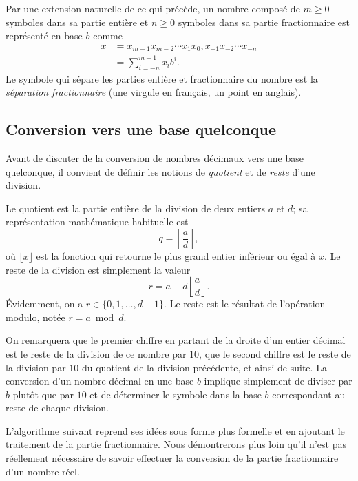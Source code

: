 \documentclass[letterpaper,11pt,english,french]{memoir}
\theoremstyle{plain}
\theoremstyle{definition}
\theoremstyle{remark}
\begin{document}
Par une extension naturelle de ce qui précède, un nombre composé de $m
\geq 0$ symboles dans sa partie entière et $n \geq 0$ symboles dans sa
partie fractionnaire est représenté en base $b$ comme
\begin{align*}
  x
  &= x_{m-1}x_{m-2} \cdots x_1x_0,x_{-1}x_{-2} \cdots x_{-n} \\
  &= \sum_{i = -n}^{m - 1} x_i b^i.
\end{align*}
Le symbole qui sépare les parties entière et fractionnaire du nombre
est la \emph{séparation fractionnaire} (une virgule en français, un
point en anglais).


\subsection{Conversion vers une base quelconque}
\label{sec:ordinateurs:conversion:10_vers_b}

Avant de discuter de la conversion de nombres décimaux vers une base
quelconque, il convient de définir les notions de \emph{quotient} et
de \emph{reste} d'une division.

Le quotient est la partie entière de la division de deux entiers $a$
et $d$; sa représentation mathématique habituelle est
\begin{equation}
  \label{eq:ordinateurs:quotient}
  q = \left\lfloor \frac{a}{d} \right\rfloor,
\end{equation}
où $\lfloor x \rfloor$ est la fonction qui retourne le plus grand
entier inférieur ou égal à $x$. Le reste de la division est simplement
la valeur
\begin{equation}
  \label{eq:ordinateurs:remainder}
  r = a - d \left\lfloor \frac{a}{d} \right\rfloor.
\end{equation}
Évidemment, on a $r \in \{0, 1, \dots, d - 1\}$. Le reste est le
résultat de l'opération modulo, notée $r = a \bmod d$.

On remarquera que le premier chiffre en partant de la droite d'un
entier décimal est le reste de la division de ce nombre par $10$, que le
second chiffre est le reste de la division par $10$ du quotient de la
division précédente, et ainsi de suite. La conversion d'un nombre
décimal en une base $b$ implique simplement de diviser par $b$ plutôt
que par $10$ et de déterminer le symbole dans la base $b$ correspondant
au reste de chaque division.

L'algorithme suivant reprend ses idées sous forme plus formelle et en
ajoutant le traitement de la partie fractionnaire. Nous démontrerons
plus loin qu'il n'est pas réellement nécessaire de savoir effectuer la
conversion de la partie fractionnaire d'un nombre réel.
\end{document}
